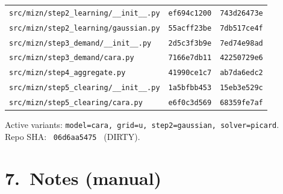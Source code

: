 \documentclass[11pt]{article}
\begin{document}
\begin{longtable}{lll}
\texttt{src/mizn/step2\_learning/\_\_init\_\_.py} & \texttt{ef694c1200} & \texttt{743d26473e} \\
\texttt{src/mizn/step2\_learning/gaussian.py} & \texttt{55acff23be} & \texttt{7db517ce4f} \\
\texttt{src/mizn/step3\_demand/\_\_init\_\_.py} & \texttt{2d5c3f3b9e} & \texttt{7ed74e98ad} \\
\texttt{src/mizn/step3\_demand/cara.py} & \texttt{7166e7db11} & \texttt{42250729e6} \\
\texttt{src/mizn/step4\_aggregate.py} & \texttt{41990ce1c7} & \texttt{ab7da6edc2} \\
\texttt{src/mizn/step5\_clearing/\_\_init\_\_.py} & \texttt{1a5bfbb453} & \texttt{15eb3e529c} \\
\texttt{src/mizn/step5\_clearing/cara.py} & \texttt{e6f0c3d569} & \texttt{68359fe7af} \\
\bottomrule
\end{longtable}

Active variants:
\texttt{model=cara, grid=u,
        step2=gaussian, solver=picard}.\\
Repo SHA: \texttt{ 06d6aa5475 }
(DIRTY).

\section*{7.~Notes (manual)}
\end{document}
